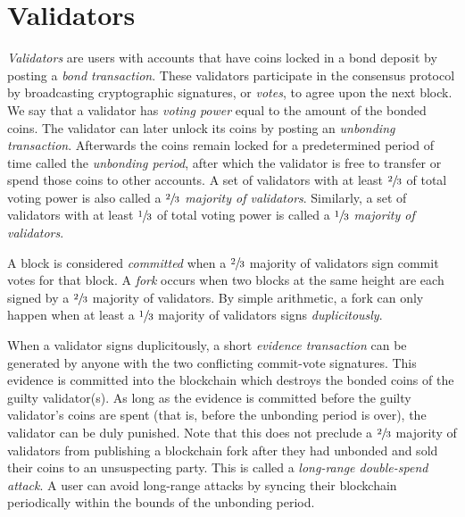 \documentclass[letter,11pt]{article}
\begin{document}
\section{Validators} %

\textit{Validators} are users with accounts that have coins locked in a bond deposit by posting a \textit{bond transaction}. These validators participate in the consensus protocol by broadcasting cryptographic signatures, or \textit{votes}, to agree upon the next block. We say that a validator has \textit{voting power} equal to the amount of the bonded coins. The validator can later unlock its coins by posting an \textit{unbonding transaction}. Afterwards the coins remain locked for a predetermined period of time called the \textit{unbonding period}, after which the validator is free to transfer or spend those coins to other accounts. A set of validators with at least $\sfrac{2}{3}$ of total voting power is also called a \textit{$\sfrac{2}{3}$ majority of validators}. Similarly, a set of validators with at least $\sfrac{1}{3}$ of total voting power is called a \textit{$\sfrac{1}{3}$ majority of validators}.

A block is considered \textit{committed} when a $\sfrac{2}{3}$ majority of validators sign commit votes for that block. A \textit{fork} occurs when two blocks at the same height are each signed by a $\sfrac{2}{3}$ majority of validators. By simple arithmetic, a fork can only happen when at least a $\sfrac{1}{3}$ majority of validators signs \textit{duplicitously}.

When a validator signs duplicitously, a short \textit{evidence transaction} can be generated by anyone with the two conflicting commit-vote signatures. This evidence is committed into the blockchain which destroys the bonded coins of the guilty validator(s). As long as the evidence is committed before the guilty validator’s coins are spent (that is, before the unbonding period is over), the validator can be duly punished. Note that this does not preclude a $\sfrac{2}{3}$ majority of validators from publishing a blockchain fork after they had unbonded and sold their coins to an unsuspecting party. This is called a \textit{long-range double-spend attack}. A user can avoid long-range attacks by syncing their blockchain periodically within the bounds of the unbonding period.
\end{document}

